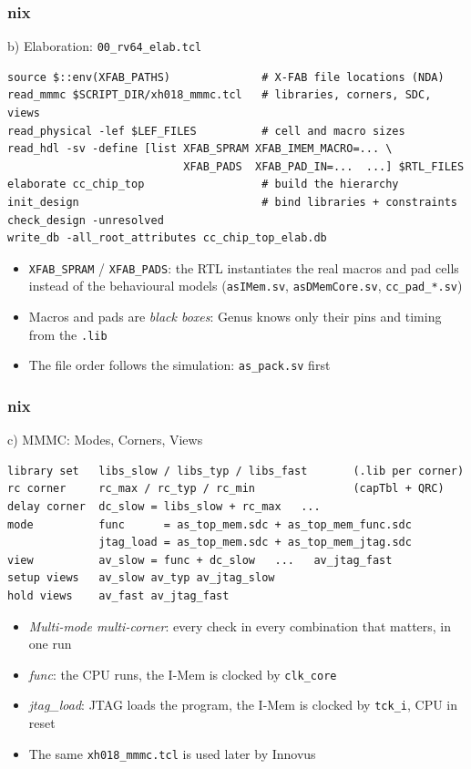 \documentclass{beamer}
\newcommand{\astitle}{nix}
\newcommand{\assubtitle}{nix}
\newcommand{\cmd}[1]{\texttt{#1}}
\begin{document}
\renewcommand{\assubtitle}{b) Elaboration: \texttt{00\_rv64\_elab.tcl}}
\begin{frame}[fragile]
\frametitle{\astitle}
\begin{block}{\assubtitle}
\begin{lstlisting}[style=sh]
source $::env(XFAB_PATHS)              # X-FAB file locations (NDA)
read_mmmc $SCRIPT_DIR/xh018_mmmc.tcl   # libraries, corners, SDC, views
read_physical -lef $LEF_FILES          # cell and macro sizes
read_hdl -sv -define [list XFAB_SPRAM XFAB_IMEM_MACRO=... \
                           XFAB_PADS  XFAB_PAD_IN=...  ...] $RTL_FILES
elaborate cc_chip_top                  # build the hierarchy
init_design                            # bind libraries + constraints
check_design -unresolved
write_db -all_root_attributes cc_chip_top_elab.db
\end{lstlisting}
  \begin{itemize}
    \item \cmd{XFAB\_SPRAM} / \cmd{XFAB\_PADS}: the RTL instantiates the
      real macros and pad cells instead of the behavioural models
      (\cmd{asIMem.sv}, \cmd{asDMemCore.sv}, \cmd{cc\_pad\_*.sv})
    \item Macros and pads are \emph{black boxes}: Genus knows only their
      pins and timing from the \cmd{.lib}
    \item The file order follows the simulation: \cmd{as\_pack.sv} first
  \end{itemize}
\end{block}
\end{frame}

\renewcommand{\assubtitle}{c) MMMC: Modes, Corners, Views}
\begin{frame}[fragile]
\frametitle{\astitle}
\begin{block}{\assubtitle}
\begin{lstlisting}
library set   libs_slow / libs_typ / libs_fast       (.lib per corner)
rc corner     rc_max / rc_typ / rc_min               (capTbl + QRC)
delay corner  dc_slow = libs_slow + rc_max   ...
mode          func      = as_top_mem.sdc + as_top_mem_func.sdc
              jtag_load = as_top_mem.sdc + as_top_mem_jtag.sdc
view          av_slow = func + dc_slow   ...   av_jtag_fast
setup views   av_slow av_typ av_jtag_slow
hold views    av_fast av_jtag_fast
\end{lstlisting}
  \begin{itemize}
    \item \emph{Multi-mode multi-corner}: every check in every combination
      that matters, in one run
    \item \emph{func}: the CPU runs, the I-Mem is clocked by \cmd{clk\_core}
    \item \emph{jtag\_load}: JTAG loads the program, the I-Mem is clocked by
      \cmd{tck\_i}, CPU in reset
    \item The same \cmd{xh018\_mmmc.tcl} is used later by Innovus
  \end{itemize}
\end{block}
\end{frame}
\end{document}
